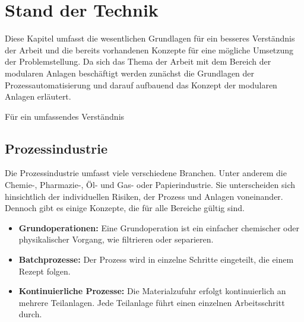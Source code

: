 
\chapter{Stand der Technik}
\label{sec:StandDerTechnik}

Diese Kapitel umfasst die wesentlichen Grundlagen für ein besseres Verständnis der Arbeit und die bereits vorhandenen Konzepte für eine mögliche Umsetzung der Problemstellung. Da sich das Thema der Arbeit mit dem Bereich der modularen Anlagen beschäftigt werden zunächst die Grundlagen der Prozessautomatisierung und darauf aufbauend das Konzept der modularen Anlagen erläutert.

Für ein umfassendes Verständnis 

\section{Prozessindustrie}
Die Prozessindustrie umfasst viele verschiedene Branchen. Unter anderem die Chemie-, Pharmazie-, Öl- und Gas- oder Papierindustrie. Sie unterscheiden sich hinsichtlich der individuellen Risiken, der Prozess und Anlagen voneinander. Dennoch gibt es einige Konzepte, die für alle Bereiche gültig sind.
\begin{itemize}
\item \textbf{Grundoperationen:} Eine Grundoperation ist ein einfacher chemischer oder physikalischer Vorgang, wie filtrieren oder separieren.
\item \textbf{Batchprozesse:} Der Prozess wird in einzelne Schritte eingeteilt, die einem Rezept folgen.
\item \textbf{Kontinuierliche Prozesse:} Die Materialzufuhr erfolgt kontinuierlich an mehrere Teilanlagen. Jede Teilanlage führt einen einzelnen Arbeitsschritt durch.
\end{itemize}

